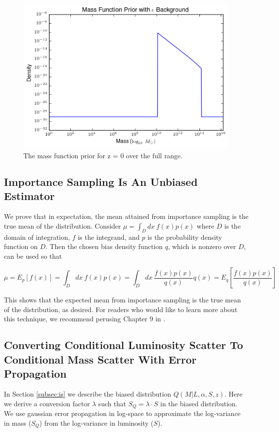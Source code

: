 \documentclass[\docopts]{\docclass}
\begin{document}
\begin{figure}[h]
\centering
\includegraphics[width=0.6\columnwidth]{epsback.png}
\caption{
The mass function prior for z = 0 over the full range.
\label{fig:epsback}}
\end{figure}

\newpage

\subsection{Importance Sampling Is An Unbiased Estimator}
\label{subsec:is_unbiased}

We prove that in expectation, the mean attained from importance sampling is the true mean of the distribution.
Consider $\mu = \int_D dx\ f(x)p(x)$ where $D$ is the domain of integration, $f$ is the integrand, and $p$ is the probability density function on $D$. Then the chosen bias density function $q$, which is nonzero over $D$, can be used so that

$$\mu = E_p[f(x)] = \int_D dx\ f(x)p(x) = \int_D dx\ \frac{f(x)p(x)}{q(x)}q(x) = E_q\left[\frac{f(x)p(x)}{q(x)}\right]$$ 

\noindent This shows that the expected mean from importance sampling is the true mean of the distribution, as desired.
For readers who would like to learn more about this technique, we recommend perusing Chapter 9 in \citealt{mcbook}.

\newpage

\subsection{Converting Conditional Luminosity Scatter To Conditional Mass Scatter With Error Propagation}
\label{subsec:error_prop}

In Section \ref{subsec:is} we describe the biased distribution $Q(M|L, \alpha, S, z)$. 
Here we derive a conversion factor $\lambda$ such that $S_Q = \lambda \cdot S$ in the biased distribution. 
We use gaussian error propagation in log-space to approximate the log-variance in mass ($S_Q$) from the log-variance in luminosity ($S$).
\end{document}
